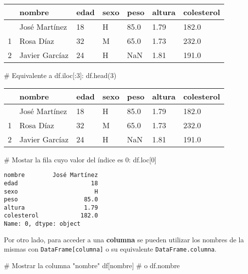 \documentclass[
  letterpaper,
  DIV=11,
  numbers=noendperiod]{scrreprt}
\newenvironment{Shaded}{\begin{snugshade}}{\end{snugshade}}
\newcommand{\CommentTok}[1]{\textcolor[rgb]{0.37,0.37,0.37}{#1}}
\newcommand{\DecValTok}[1]{\textcolor[rgb]{0.68,0.00,0.00}{#1}}
\newcommand{\NormalTok}[1]{\textcolor[rgb]{0.00,0.23,0.31}{#1}}
\newcommand{\StringTok}[1]{\textcolor[rgb]{0.13,0.47,0.30}{#1}}
\begin{document}
\begin{longtable}[]{@{}lllllll@{}}
\toprule\noalign{}
& nombre & edad & sexo & peso & altura & colesterol \\
\midrule\noalign{}
\endhead
\bottomrule\noalign{}
\endlastfoot
0 & José Martínez & 18 & H & 85.0 & 1.79 & 182.0 \\
1 & Rosa Díaz & 32 & M & 65.0 & 1.73 & 232.0 \\
2 & Javier Garcíaz & 24 & H & NaN & 1.81 & 191.0 \\
\end{longtable}

\begin{Shaded}
\begin{Highlighting}[]
\CommentTok{\# Equivalente a df.iloc[:3]:}
\NormalTok{df.head(}\DecValTok{3}\NormalTok{)}
\end{Highlighting}
\end{Shaded}

\begin{longtable}[]{@{}lllllll@{}}
\toprule\noalign{}
& nombre & edad & sexo & peso & altura & colesterol \\
\midrule\noalign{}
\endhead
\bottomrule\noalign{}
\endlastfoot
0 & José Martínez & 18 & H & 85.0 & 1.79 & 182.0 \\
1 & Rosa Díaz & 32 & M & 65.0 & 1.73 & 232.0 \\
2 & Javier Garcíaz & 24 & H & NaN & 1.81 & 191.0 \\
\end{longtable}

\begin{Shaded}
\begin{Highlighting}[]
\CommentTok{\# Mostar la fila cuyo valor del índice es 0:}
\NormalTok{df.loc[}\DecValTok{0}\NormalTok{]}
\end{Highlighting}
\end{Shaded}

\begin{verbatim}
nombre        José Martínez
edad                     18
sexo                      H
peso                   85.0
altura                 1.79
colesterol            182.0
Name: 0, dtype: object
\end{verbatim}

Por otro lado, para acceder a una \textbf{columna} se pueden utilizar
los nombres de la mismas con \texttt{DataFrame{[}columna{]}} o su
equivalente \texttt{DataFrame.columna}.

\begin{Shaded}
\begin{Highlighting}[]
\CommentTok{\# Mostrar la columna "nombre"}
\NormalTok{df[}\StringTok{\textquotesingle{}nombre\textquotesingle{}}\NormalTok{] }\CommentTok{\# o df.nombre}
\end{Highlighting}
\end{Shaded}
\end{document}
